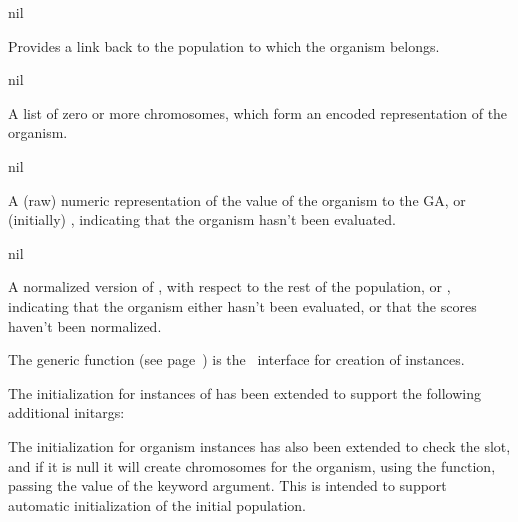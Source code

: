 {

\filbreak

{\samepage

\gap


   {nil}

  Provides a link back to the population to which the organism belongs.
\par}%

\filbreak
{\samepage
   {nil}

  A list of zero or more chromosomes, which form an encoded representation
  of the organism. 
\par}%

\filbreak
{\samepage
   {nil}

  A (raw) numeric representation of the value of the organism to the GA,
  or (initially) , indicating that the organism hasn't been evaluated.
\par}%

\filbreak
{\samepage
   {nil}

  A normalized version of , with respect to the rest of the
population, or , indicating that the organism either hasn't been
evaluated, or that the scores haven't been normalized.
\par}%

\gap

\filbreak
{\samepage


The generic function  (see page~\pageref{method:make-organism})
is the \geco\ interface for creation of  instances.

The initialization for instances of  has been extended to
support the following additional initargs:


The initialization for organism instances has also been extended to check the
 slot, and if it is null it will create chromosomes for the
organism, using the  function, passing the value of the
 keyword argument. This is intended to support automatic initialization
of the initial population. 
\par}%

}
